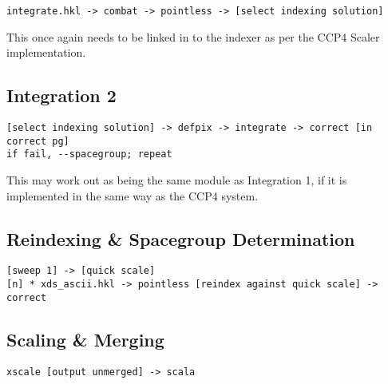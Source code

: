 \documentclass[a4paper, 11pt]{article}
\begin{document}
\begin{verbatim}
integrate.hkl -> combat -> pointless -> [select indexing solution]
\end{verbatim}

This once again needs to be linked in to the indexer as per the 
CCP4 Scaler implementation. 

\subsection{Integration 2}

\begin{verbatim}
[select indexing solution] -> defpix -> integrate -> correct [in correct pg]
if fail, --spacegroup; repeat
\end{verbatim}

This may work out as being the same module as Integration 1, if it is
implemented in the same way as the CCP4 system.

\subsection{Reindexing \& Spacegroup Determination}

\begin{verbatim}
[sweep 1] -> [quick scale]
[n] * xds_ascii.hkl -> pointless [reindex against quick scale] -> correct
\end{verbatim}

\subsection{Scaling \& Merging}

\begin{verbatim}
xscale [output unmerged] -> scala
\end{verbatim}
\end{document}
